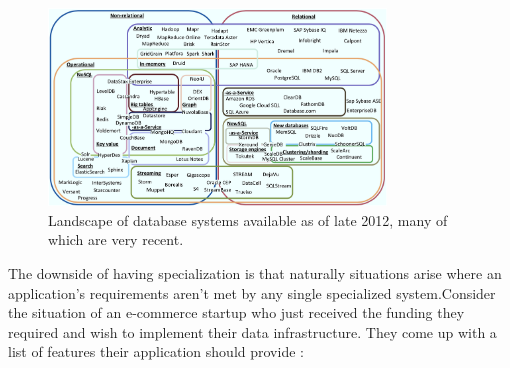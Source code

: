 \begin{figure}
 \centering
  \includegraphics[width=0.8\textwidth]{images/DBLandscapeWithStream.png}
  \caption{Landscape of database systems available as of late 2012, many of which are very recent.}
  \label{fig:dblandscape}
\end{figure}


The downside of having specialization is that naturally situations arise where an application's requirements aren't met by any single specialized system.Consider the situation of an e-commerce startup who just received the funding they required and wish to implement their data infrastructure. They come up with a list of features their application should provide : 

